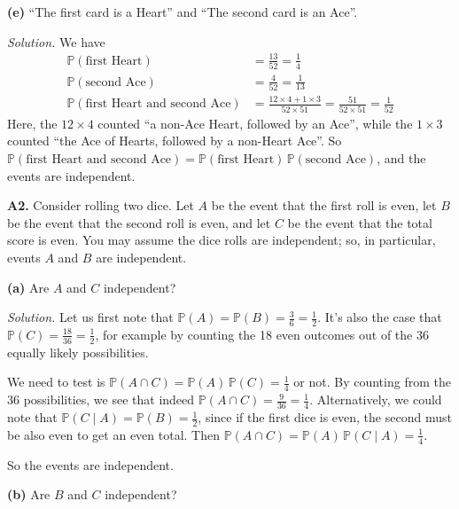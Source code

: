\documentclass[
  a4paper,
]{book}
\theoremstyle{definition}
\theoremstyle{definition}
\theoremstyle{definition}
\theoremstyle{definition}
\theoremstyle{remark}
\begin{document}
\textbf{(e)} ``The first card is a Heart'' and ``The second card is an Ace''.

\begin{myanswers}
\emph{Solution.}
We have
\begin{align*}
\mathbb P(\text{first Heart}) &= \frac{13}{52} = \frac14 \\
\mathbb P(\text{second Ace}) &= \frac{4}{52} = \frac1{13} \\
\mathbb P(\text{first Heart and second Ace}) &= \frac{12\times4 + 1\times 3}{52\times 51} = \frac{51}{52\times 51} = \frac{1}{52}
\end{align*}
Here, the \(12 \times 4\) counted ``a non-Ace Heart, followed by an Ace'', while the \(1 \times 3\) counted ``the Ace of Hearts, followed by a non-Heart Ace''. So \(\mathbb P(\text{first Heart and second Ace}) = \mathbb P(\text{first Heart})\,\mathbb P(\text{second Ace})\), and the events are independent.

\end{myanswers}

\textbf{A2.} Consider rolling two dice. Let \(A\) be the event that the first roll is even, let \(B\) be the event that the second roll is even, and let \(C\) be the event that the total score is even. You may assume the dice rolls are independent; so, in particular, events \(A\) and \(B\) are independent.

\textbf{(a)} Are \(A\) and \(C\) independent?

\begin{myanswers}
\emph{Solution.} Let us first note that \(\mathbb P(A) = \mathbb P(B) = \frac36 = \frac12\). It's also the case that \(\mathbb P(C) = \frac{18}{36} = \frac12\), for example by counting the 18 even outcomes out of the 36 equally likely possibilities.

We need to test is \(\mathbb P(A \cap C) = \mathbb P(A) \, \mathbb P(C) = \frac14\) or not. By counting from the 36 possibilities, we see that indeed \(\mathbb P(A \cap C) = \frac{9}{36} = \frac{1}{4}\). Alternatively, we could note that \(\mathbb P(C \mid A) = \mathbb P(B) = \frac12\), since if the first dice is even, the second must be also even to get an even total. Then \(\mathbb P(A \cap C) = \mathbb P(A) \, \mathbb P(C \mid A) = \frac14\).

So the events are independent.

\end{myanswers}

\textbf{(b)} Are \(B\) and \(C\) independent?
\end{document}
